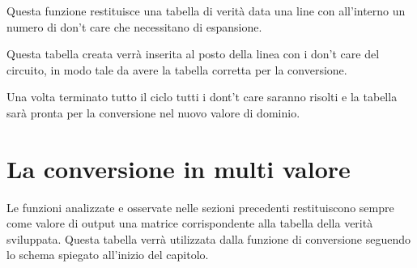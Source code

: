 \documentclass[
  italian,
]{book}
\begin{document}
Questa funzione restituisce una tabella di verità data una line con all'interno un numero di don't care che necessitano di espansione.

Questa tabella creata verrà inserita al posto della linea con i don't care del circuito, in modo tale da avere la tabella corretta per la conversione.

Una volta terminato tutto il ciclo tutti i dont't care saranno risolti e la tabella sarà pronta per la conversione nel nuovo valore di dominio.

\newpage

\hypertarget{la-conversione-in-multi-valore}{%
\section{La conversione in multi valore}\label{la-conversione-in-multi-valore}}

Le funzioni analizzate e osservate nelle sezioni precedenti restituiscono sempre come valore di output una matrice corrispondente alla tabella della verità sviluppata. Questa tabella verrà utilizzata dalla funzione di conversione seguendo lo schema spiegato all'inizio del capitolo.
\end{document}
